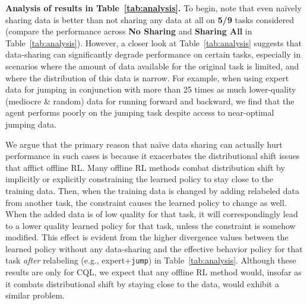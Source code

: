 \begin{table}[t]
         \caption{\footnotesize We analyze how sharing data across all tasks (\textbf{Sharing All}) compares to \textbf{No Sharing} in the multi-task walker2d environment with three tasks: run forward, run backward, and jump. We provide three scenarios with different styles of per-task offline datasets in the leftmost column. The second column shows the number of transitions in each dataset. We report the per-task average return, the KL divergence between the single-task optimal policy $\pi$ and the behavior policy $\behavior$ after the data sharing scheme, as well as averages across tasks. \textbf{Sharing All} generally helps training while increasing the KL divergence. However, on the row highlighted in yellow, \textbf{Sharing All} yields a particularly large KL divergence between the single-task $\pi$ and $\behavior$ and degrades the performance, suggesting sharing data for all tasks is brittle.
     \label{tab:analysis}
     \vspace{-0.2cm}
     }
\end{table}

\textbf{Analysis of results in Table~\ref{tab:analysis}.} To begin, note that even na\"ively sharing data is  better than not sharing any data at all on \textbf{5/9} tasks considered
(compare the performance across \textbf{No Sharing} and \textbf{Sharing All} in Table~\ref{tab:analysis}). However, a closer look at Table~\ref{tab:analysis} suggests that data-sharing can significantly degrade performance on certain tasks, especially in scenarios where the amount of data available for the original task is limited, and where the distribution of this data is narrow.
For example, when using expert data for jumping in conjunction with more than 25 times as much lower-quality (mediocre \& random) data for running forward and backward, we find that the agent performs poorly on the jumping task despite access to near-optimal jumping data.

 We argue that the primary reason that na\"{i}ve data sharing can actually hurt performance in such cases is because it exacerbates the distributional shift issues that afflict offline RL. Many offline RL methods combat distribution shift by implicitly or explicitly constraining the learned policy to stay close to the training data. Then, when the training data is changed by adding relabeled data from another task, the constraint causes the learned policy to change as well. When the added data is of low quality for that task, it will correspondingly lead to a lower quality learned policy for that task, unless the constraint is somehow modified. This effect is evident from the higher divergence values between the learned policy without any data-sharing and the effective behavior policy for that task \emph{after} relabeling (e.g., expert+\texttt{jump}) in Table~\ref{tab:analysis}. Although these results are only for CQL, we expect that any offline RL method would, insofar as it combats distributional shift by staying close to the data, would exhibit a similar problem. 


